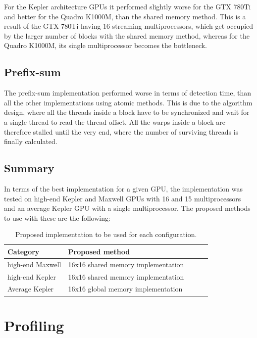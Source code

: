 For the Kepler architecture GPUs it performed slightly worse for the GTX 780Ti and better for the Quadro K1000M, than the shared memory method. This is a result of the GTX 780Ti having 16 streaming multiprocessors, which get occupied by the larger number of blocks with the shared memory method, whereas for the Quadro K1000M, its single multiprocessor becomes the bottleneck.

\subsection{Prefix-sum}

The prefix-sum implementation performed worse in terms of detection time, than all the other implementations using atomic methods. This is due to the algorithm design, where all the threads inside a block have to be synchronized and wait for a single thread to read the thread offset. All the warps inside a block are therefore stalled until the very end, where the number of surviving threads is finally calculated.

\subsection{Summary}

In terms of the best implementation for a given GPU, the implementation was tested on high-end Kepler and Maxwell GPUs with 16 and 15 multiprocessors and an average Kepler GPU with a single multiprocessor. The proposed methods to use with these are the following:

\begin{table}[htbp]
\label{tab:proposed-methods}
\centering
\begin{tabular}{| l | l | l | l | l |}
\hline
Category & Proposed method \\
\hline
high-end Maxwell & 16x16 shared memory implementation \\
\hline
high-end Kepler & 16x16 shared memory implementation \\
\hline
Average Kepler & 16x16 global memory implementation \\
\hline
\end{tabular}
\caption{Proposed implementation to be used for each configuration.}
\end{table}

\section{Profiling}\label{sec:profiling}

